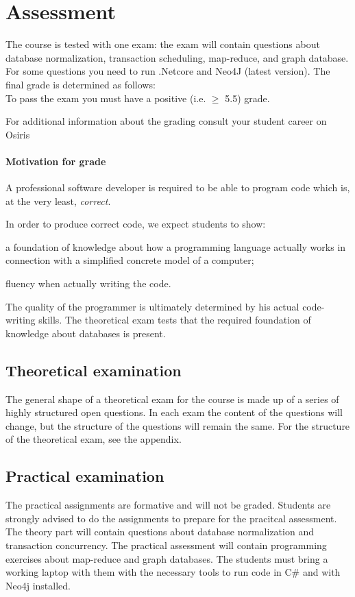 \section{Assessment}
	The course is tested with one exam: the exam will contain questions about database normalization, transaction scheduling, map-reduce, and graph database.  For some questions you need to run .Netcore and Neo4J (latest version).
	The final grade is determined as follows: \\

	To pass the exam you must have a positive (i.e. $\geq$ 5.5) grade.
	
	For additional information about the grading consult your student career on Osiris

	\paragraph*{Motivation for grade}
		A professional software developer is required to be able to program code which is, at the very least, \textit{correct}.

		In order to produce correct code, we expect students to show:
		\begin{inparaenum}
			\item a foundation of knowledge about how a programming language actually works in connection with a simplified concrete model of a computer;
			\item fluency when actually writing the code.
		\end{inparaenum}

		The quality of the programmer is ultimately determined by his actual code-writing skills.  The theoretical exam tests that the required foundation of knowledge about databases is present.


	\subsection{Theoretical examination}
		The general shape of a theoretical exam for the course is made up of a series of highly structured open questions. In each exam the content of the questions will change, but the structure of the questions will remain the same. For the structure of the theoretical exam, see the appendix.


	\subsection{Practical examination}
		The practical assignments are formative and will not be graded. Students are strongly advised to do the assignments to prepare for the pracitcal assessment. The theory part will contain questions about database normalization and transaction concurrency. The practical assessment will contain programming exercises about map-reduce and graph databases. The students must bring a working laptop with them with the necessary tools to run code in C\# and with Neo4j installed.
